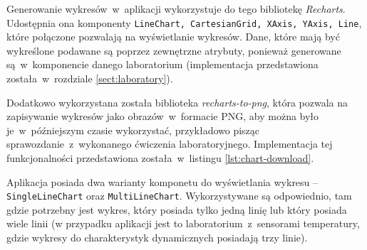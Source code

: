 Generowanie wykresów~w~aplikacji wykorzystuje do tego bibliotekę \textit{Recharts}. Udostępnia ona
komponenty \texttt{LineChart, CartesianGrid, XAxis, YAxis, Line}, które połączone pozwalają na
wyświetlanie wykresów. Dane, które mają być wykreślone podawane są poprzez zewnętrzne atrybuty,
ponieważ generowane są~w~komponencie danego laboratorium (implementacja przedstawiona
została~w~rozdziale \ref{sect:laboratory}).

Dodatkowo wykorzystana została biblioteka \textit{recharts-to-png}, która pozwala na zapisywanie
wykresów jako obrazów~w~formacie PNG, aby można było je~w~późniejszym czasie wykorzystać,
przykładowo pisząc sprawozdanie~z~wykonanego ćwiczenia laboratoryjnego. Implementacja tej
funkcjonalności przedstawiona została~w~listingu \ref{lst:chart-download}.


Aplikacja posiada dwa warianty komponetu do wyświetlania wykresu -- \texttt{SingleLineChart} oraz
\texttt{MultiLineChart}. Wykorzystywane są odpowiednio, tam gdzie potrzebny jest wykres, który
posiada tylko jedną linię lub który posiada wiele linii (w przypadku aplikacji jest to
laboratorium~z~sensorami temperatury, gdzie wykresy do charakterystyk dynamicznych posiadają trzy
linie).
